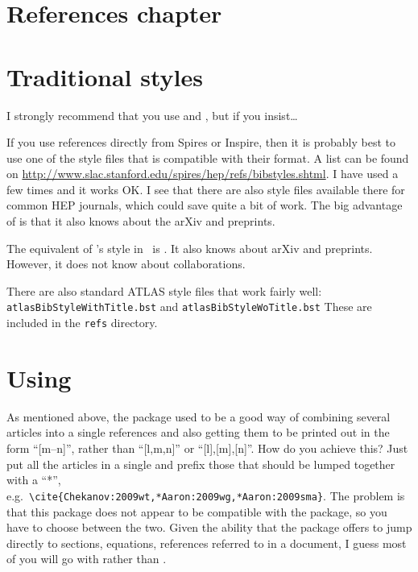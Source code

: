 \section*{References chapter}%
\label{sec:app:ref}

\section{Traditional \BibTeX{} styles}%
\label{sec:app:ref:bst}

I strongly recommend that you use  and , but if you insist\ldots

If you use references directly from Spires or Inspire, then it is
probably best to use one of the style files that is compatible with
their format. A list can be found on
\url{http://www.slac.stanford.edu/spires/hep/refs/bibstyles.shtml}. I
have used  a few times and it works OK\@. I see that
there are also style files available there for common HEP journals,
which could save quite a bit of work. The big advantage of
 is that it also knows about the arXiv and preprints.

The equivalent of 's  style in \BibTeX\ is
. It also knows about arXiv and preprints. However, it
does not know about collaborations.

There are also standard ATLAS style files that work fairly well:
\texttt{atlasBibStyleWithTitle.bst} and \texttt{atlasBibStyleWoTitle.bst}
These are included in the \texttt{refs} directory.

\section{Using }%
\label{sec:app:ref:mcite}

As mentioned above, the  package used to be a good way
of combining several articles into a single references and also
getting them to be printed out in the form \enquote{[m--n]}, rather
than \enquote{[l,m,n]} or \enquote{[l],[m],[n]}. How do you achieve
this?  Just put all the articles in a single  and prefix
those that should be lumped together with a \enquote{*},\\
e.g.\ \verb+\cite{Chekanov:2009wt,*Aaron:2009wg,*Aaron:2009sma}+.
The problem is that this package does not appear to be compatible with the
 package, so you have to choose between the
two. Given the ability that the  package offers to
jump directly to sections, equations, references referred to in a
document, I guess most of you will go with  rather
than .

